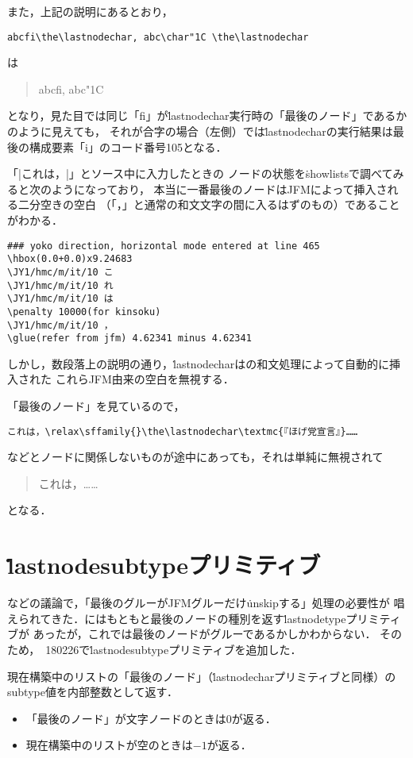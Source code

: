\documentclass[a4paper,11pt,nomag]{jsarticle}
\begin{document}
また，上記の説明にあるとおり，
\begin{verbatim}
abcfi\the\lastnodechar, abc\char"1C \the\lastnodechar
\end{verbatim}
は
\begin{quote}
abcfi\the\lastnodechar, abc\char"1C \the\lastnodechar
\end{quote}
となり，見た目では同じ「fi」が\.{lastnodechar}実行時の「最後のノード」であるかのように見えても，
それが合字の場合（左側）では\.{lastnodechar}の実行結果は最後の構成要素「i」のコード番号105となる．

\begin{dangerous}
  「|これは，|」とソース中に入力したときの
  ノードの状態を\.{showlists}で調べてみると次のようになっており，
  本当に一番最後のノードはJFMによって挿入される二分空きの空白
  （「，」と通常の和文文字の間に入るはずのもの）であることがわかる．
\begin{verbatim}
### yoko direction, horizontal mode entered at line 465
\hbox(0.0+0.0)x9.24683
\JY1/hmc/m/it/10 こ
\JY1/hmc/m/it/10 れ
\JY1/hmc/m/it/10 は
\penalty 10000(for kinsoku)
\JY1/hmc/m/it/10 ，
\glue(refer from jfm) 4.62341 minus 4.62341
\end{verbatim}
  しかし，数段落上の説明の通り，\.{lastnodechar}は\pTeX の和文処理によって自動的に挿入された
  これらJFM由来の空白を無視する．
\end{dangerous}

「最後のノード」を見ているので，
\begin{verbatim}
これは，\relax\sffamily{}\the\lastnodechar\textmc{『ほげ党宣言』}……
\end{verbatim}
などとノードに関係しないものが途中にあっても，それは単純に無視されて
\begin{quote}
これは，\relax\sffamily{}\the\lastnodechar{}……
\end{quote}
となる．

\section{\.{lastnodesubtype}プリミティブ}
\cite{tjb28,plt63}などの議論で，「最後のグルーがJFMグルーだけ\.{unskip}する」処理の必要性が
唱えられてきた．\epTeX にはもともと最後のノードの種別を返す\.{lastnodetype}プリミティブが
あったが，これでは最後のノードがグルーであるかしかわからない．
そのため，\epTeX~180226で\.{lastnodesubtype}プリミティブを追加した．

\begin{cslist}
 \csitem[\.{lastnodesubtype}]
 現在構築中のリストの「最後のノード」（\.{lastnodechar}プリミティブと同様）の
 subtype値を内部整数として返す．
\begin{itemize}
 \item 「最後のノード」が文字ノードのときは0が返る．
 \item 現在構築中のリストが空のときは$-1$が返る．
\end{itemize}
\end{cslist}
\end{document}
